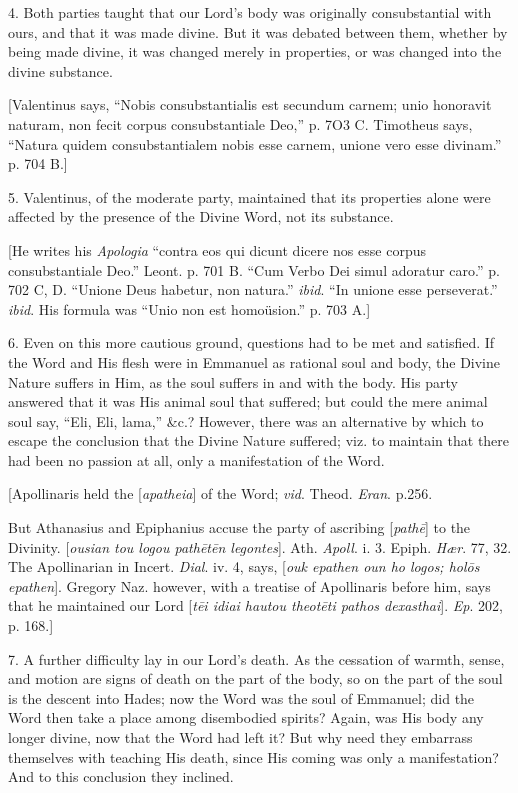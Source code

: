 4. Both parties taught that our Lord's body was originally
consubstantial with ours, and that it was made divine. But it was
debated between them, whether by being made divine, it was changed
merely in properties, or was changed into the divine substance.

[Valentinus says, ``Nobis consubstantialis est secundum carnem;
unio honoravit naturam, non fecit corpus consubstantiale Deo,'' p.
7O3 C. Timotheus says, ``Natura quidem consubstantialem nobis esse
carnem, unione vero esse divinam.'' p. 704 B.]

5. Valentinus, of the moderate party, maintained that its
properties alone were affected by the presence of the Divine Word, not
its substance.

[He writes his \emph{Apologia} ``contra eos qui dicunt dicere
nos esse corpus consubstantiale Deo.'' Leont. p. 701 B. ``Cum
Verbo Dei simul adoratur caro.'' p. 702 C, D. ``Unione Deus
habetur, non natura.'' \emph{ibid}. ``In unione esse
perseverat.'' \emph{ibid}. His formula was ``Unio non est homoüsion.''
p. 703 A.]

6. Even on this more cautious ground, questions had to be met and
satisfied. If the Word and His flesh were in Emmanuel as rational soul
and body, the Divine Nature suffers in Him, as the soul suffers in and
with the body. His party answered that it was His animal soul that
suffered; but could the mere animal soul say, ``Eli, Eli,
lama,'' \&c.? However, there was an alternative by which to
escape the conclusion that the Divine Nature suffered; viz. to
maintain that there had been no passion at all, only a manifestation
of the Word.

[Apollinaris held the [\emph{apatheia}] of the Word; \emph{vid}.
Theod. \emph{Eran}. p.256.

But Athanasius and Epiphanius accuse the party of ascribing [\emph{path\={e}}]
to the Divinity. [\emph{ousian tou logou path\={e}t\={e}n legontes}].
Ath. \emph{Apoll}. i. 3. Epiph. \emph{Hær}. 77, 32. The Apollinarian
in Incert. \emph{Dial}. iv. 4, says, [\emph{ouk epathen oun ho logos; hol\={o}s
epathen}]. Gregory Naz. however, with a treatise of Apollinaris
before him, says that he maintained our Lord [\emph{t\={e}i idiai
hautou theot\={e}ti pathos dexasthai}]. \emph{Ep}. 202, p. 168.]

7. A further difficulty lay in our Lord's death. As the cessation
of warmth, sense, and motion are signs of death on the part of the
body, so on the part of the soul is the descent into Hades; now the
Word was the soul of Emmanuel; did the Word then take a place among
disembodied spirits? Again, was His body any longer divine, now that
the Word had left it? But why need they embarrass themselves with
teaching His death, since His coming was only a manifestation? And to
this conclusion they inclined.

